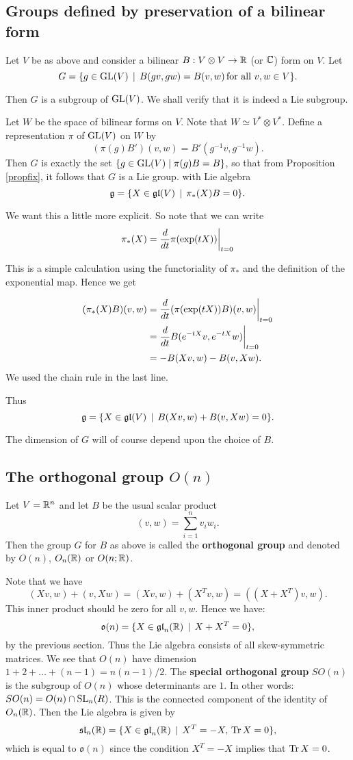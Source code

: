 \documentclass[11pt, english]{article}
\begin{document}
\subsection{Groups defined by preservation of a bilinear form}

Let $V$ be as above and consider a bilinear $B:V \otimes V \to \mathbb{R}$ (or $\mathbb{C}$) form on $V$. Let
$$
G = \{ g \in \operatorname{GL}(V) \, \mid  \, B(gv,gw)=B(v,w) \, \text{for all } v,w \in V \}.
$$

Then $G$ is a subgroup of $\operatorname{GL}(V)$. We shall verify that it is indeed a Lie subgroup.

Let $W$ be the space of bilinear forms on $V$. Note that $W \simeq V^\ast \otimes V^\ast$. Define a representation $\pi$ of $\operatorname{GL}(V)$ on $W$ by
$$
(\pi(g)B')(v,w) = B'(g^{-1}v,g^{-1}w).
$$
Then $G$ is exactly the set $\{  g \in \operatorname{GL}(V) \mid \pi(g) B = B \}$, so that from Proposition \ref{propfix}, it follows that $G$ is a Lie group. with Lie algebra
$$
\mathfrak g = \{X \in \mathfrak{gl}(V) \, \mid \, \pi_\ast(X) B = 0 \}.
$$

We want this a little more explicit. So note that we can write
$$
\pi_\ast(X) = \restr{\frac{d}{dt}\pi(\exp(t X)) }{t=0}
$$

This is a simple calculation using the functoriality of $\pi_\ast$ and the definition of the exponential map. Hence we get

\begin{align*}
(\pi_\ast(X) B)(v,w) &= \restr{\frac{d}{dt} (\pi(\exp(tX))B)(v,w) }{t=0} \\
&= \restr{\frac{d}{dt}  B(e^{-tX} v, e^{-tX} w)}{t=0} \\
&= -B(Xv,w)-B(v,Xw).
\end{align*}
We used the chain rule in the last line.

Thus
$$
\mathfrak g =  \{X \in \mathfrak{gl}(V) \, \mid \, B(Xv,w)+B(v,Xw) = 0 \}.
$$

The dimension of $G$ will of course depend upon the choice of $B$.

\subsection{The orthogonal group $O(n)$}

Let $V=\mathbb{R}^n$ and let $B$ be the usual scalar product
$$
(v,w) = \sum_{i=1}^n v_i w_i.
$$
Then the group $G$ for $B$ as above is called the \textbf{orthogonal group} and denoted by $O(n)$, $O_n(\mathbb{R})$ or $O(n; \mathbb{R})$. 

Note that we have
$$
(Xv,w)+(v,Xw) = (Xv,w)+(X^Tv,w)= ((X+X^T)v,w).
$$
This inner product should be zero for all $v,w$. Hence we have:
$$
\mathfrak{o}(n) = \{ X \in \mathfrak{gl}_n(\mathbb{R}) \, \mid \, X+X^T = 0 \},
$$
by the previous section. Thus the Lie algebra consists of all skew-symmetric matrices. We see that $O(n)$ have dimension $1+2+\ldots+(n-1)=n(n-1)/2$. The \textbf{special orthogonal group} $SO(n)$ is the subgroup of $O(n)$ whose determinants are $1$. In other words: $SO(n) = O(n) \cap \operatorname{SL}_n(R)$. This is the connected component of the identity of $O_n(\mathbb{R})$. Then the Lie algebra is given by
$$
\mathfrak{sl}_n(\mathbb{R}) = \{ X \in \mathfrak{gl}_n(\mathbb{R}) \, \mid \, X^T=-X, \, \operatorname{Tr} X = 0 \},
$$
which is equal to $\mathfrak{o}(n)$ since the condition $X^T=-X$ implies that $\operatorname{Tr} X = 0$.
\end{document}
